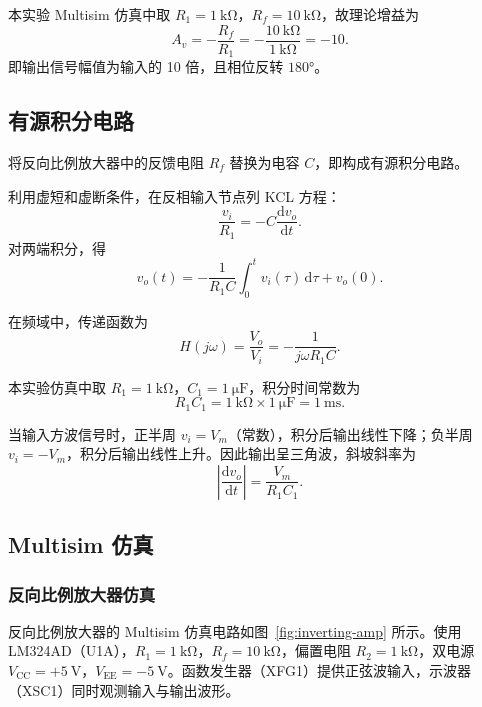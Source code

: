 \documentclass[12pt]{ctexart}
\begin{document}
本实验 Multisim 仿真中取 $R_1=\SI{1}{\kilo\ohm}$，$R_f=\SI{10}{\kilo\ohm}$，故理论增益为
\begin{equation}
    A_v = -\frac{R_f}{R_1} = -\frac{\SI{10}{\kilo\ohm}}{\SI{1}{\kilo\ohm}} = -10.
\end{equation}
即输出信号幅值为输入的 10 倍，且相位反转 $180°$。

\subsection{有源积分电路}

将反向比例放大器中的反馈电阻 $R_f$ 替换为电容 $C$，即构成有源积分电路。

利用虚短和虚断条件，在反相输入节点列 KCL 方程：
\begin{equation}
    \frac{v_i}{R_1} = -C\frac{\mathrm{d}v_o}{\mathrm{d}t}.
\end{equation}
对两端积分，得
\begin{equation}
    v_o(t) = -\frac{1}{R_1 C}\int_0^t v_i(\tau)\,\mathrm{d}\tau + v_o(0).
    \label{eq:integrator}
\end{equation}

在频域中，传递函数为
\begin{equation}
    H(j\omega) = \frac{V_o}{V_i} = -\frac{1}{j\omega R_1 C}.
\end{equation}

本实验仿真中取 $R_1=\SI{1}{\kilo\ohm}$，$C_1=\SI{1}{\micro\farad}$，积分时间常数为
\begin{equation}
    R_1 C_1 = \SI{1}{\kilo\ohm}\times\SI{1}{\micro\farad} = \SI{1}{\milli\second}.
\end{equation}

当输入方波信号时，正半周 $v_i = V_m$（常数），积分后输出线性下降；负半周 $v_i = -V_m$，积分后输出线性上升。因此输出呈三角波，斜坡斜率为
\begin{equation}
    \left|\frac{\mathrm{d}v_o}{\mathrm{d}t}\right| = \frac{V_m}{R_1 C_1}.
\end{equation}

\subsection{Multisim 仿真}

\subsubsection{反向比例放大器仿真}

反向比例放大器的 Multisim 仿真电路如图~\ref{fig:inverting-amp} 所示。使用 LM324AD（U1A），$R_1=\SI{1}{\kilo\ohm}$，$R_f=\SI{10}{\kilo\ohm}$，偏置电阻 $R_2=\SI{1}{\kilo\ohm}$，双电源 $V_{\mathrm{CC}}=+\SI{5}{\volt}$，$V_{\mathrm{EE}}=-\SI{5}{\volt}$。函数发生器（XFG1）提供正弦波输入，示波器（XSC1）同时观测输入与输出波形。
\end{document}
